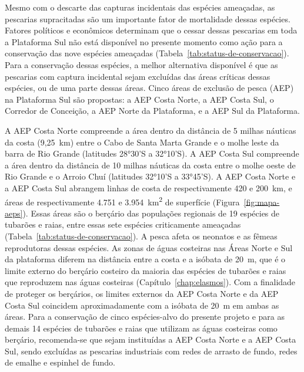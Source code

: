 \documentclass[a4paper,11pt,twoside,showtrims,onecolumn,openright,final]{memoir}
\begin{document}

Mesmo com o descarte das capturas incidentais das espécies ameaçadas, as pescarias supracitadas 
são um importante fator de mortalidade dessas espécies. Fatores políticos e econômicos 
determinam que o cessar dessas pescarias em toda a Plataforma  Sul não está disponível no 
presente momento como ação para a conservação das nove espécies ameaçadas (Tabela~\ref{tab:status-de-conservacao}). 
Para a conservação dessas espécies, a melhor alternativa disponível é que as pescarias 
com captura incidental sejam excluídas das áreas críticas dessas espécies, ou de uma parte 
dessas áreas. Cinco áreas de exclusão de pesca (AEP) na Plataforma Sul são propostas: 
a AEP Costa Norte, a AEP Costa Sul, o Corredor de Conceição, a AEP Norte da Plataforma, 
e a AEP Sul da Plataforma. 

A AEP Costa Norte compreende a área dentro da distância de 5 milhas náuticas da costa (9,25~km) 
entre o Cabo de Santa Marta Grande e o molhe leste da barra de Rio Grande (latitudes 28°30'S a 32°10'S). 
A AEP Costa Sul compreende a área dentro da distância de 10 milhas náuticas da costa entre o molhe oeste 
de Rio Grande e o Arroio Chuí (latitudes 32°10'S a 33°45'S). A AEP Costa Norte e a AEP Costa Sul abrangem linhas 
de costa de respectivamente 420 e 200~km, e áreas de respectivamente 4.751 e 3.954~km\textsuperscript{2} 
de superfície (Figura~\ref{fig:mapa-aeps}).  Essas áreas são o berçário das populações regionais 
de 19 espécies de tubarões e raias,
entre essas sete espécies criticamente ameaçadas (Tabela~\ref{tab:status-de-conservacao}).  A pesca 
afeta os neonatos e as fêmeas reprodutoras dessas espécies. As zonas de águas costeiras nas Áreas Norte 
e Sul da plataforma diferem na distância entre a costa e a isóbata de 20~m, que é o limite externo do berçário 
costeiro da maioria das espécies de tubarões e raias que reproduzem nas águas costeiras (Capítulo~\ref{chap:elasmos}). %
Com a finalidade de proteger os berçários, os limites externos da AEP Costa Norte e da AEP Costa Sul 
coincidem aproximadamente com a isóbata de 20~m em ambas as áreas. Para a conservação de cinco
espécies-alvo do presente projeto e para as demais 14 espécies de tubarões e raias que utilizam as 
águas costeiras como berçário, recomenda-se que sejam instituídas a AEP Costa Norte e a AEP Costa Sul, 
sendo excluídas as pescarias industriais com redes de arrasto de fundo,  redes de emalhe 
e espinhel de fundo. %
\end{document}
